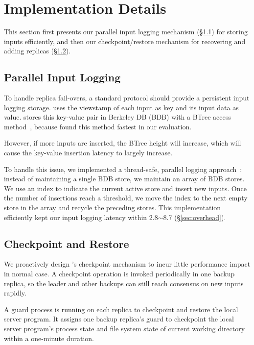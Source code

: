 \section{Implementation Details} \label{sec:impl}

This section first presents our parallel input logging mechanism 
(\S\ref{sec:logging}) for storing inputs efficiently, and then our 
checkpoint/restore mechanism for recovering and adding replicas 
(\S\ref{sec:checkpoint}).

\subsection{Parallel Input Logging} \label{sec:logging}

To handle replica fail-overs, a standard \paxos protocol should provide a 
persistent input logging storage. \xxx uses the \paxos viewstamp of each input 
as key and its input data as value. \xxx stores this key-value pair in 
Berkeley DB (BDB) with a BTree access method~\cite{berkeleydb}, because found 
this method fastest in our evaluation.

However, if more inputs are inserted, the BTree height 
will increase, which will cause the key-value insertion latency to 
largely increase.

To handle this issue, we implemented a thread-safe, 
parallel logging approach~\cite{Bessani:usenix13}: instead of maintaining a 
single BDB store, we maintain an array of BDB stores. We use an index to 
indicate the current active store and insert new inputs. Once the number of 
insertions reach a threshold, we move the index to the next empty store in the 
array and recycle the preceding stores. This implementation efficiently kept 
our input logging latency within 2.8$\sim$8.7 \us (\S\ref{sec:overhead}).

\subsection{Checkpoint and Restore} \label{sec:checkpoint}

We proactively design \xxx's checkpoint mechanism to incur little performance 
impact in normal case. A checkpoint operation is invoked periodically 
in one backup replica, so the leader and other backups can still reach 
consensus on new inputs rapidly.

A guard process is running on each replica to checkpoint and restore the 
local server program. It assigns one backup 
replica's guard to checkpoint the local server program's process state and file 
system state of current working directory within a one-minute duration.

